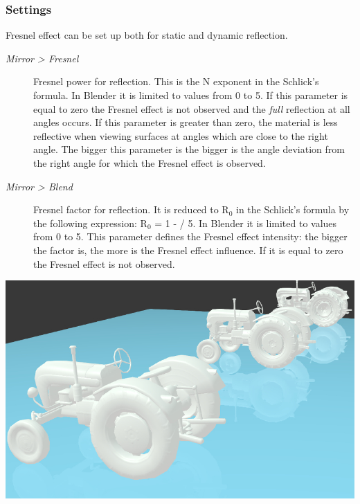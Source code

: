 \documentclass[a4paper,12pt,oneside]{sphinxmanual}
\begin{document}
\subsubsection{Settings}
\label{materials:id12}
Fresnel effect can be set up both for static and dynamic reflection.
\begin{description}
\item[{\emph{Mirror \textgreater{} Fresnel}}] \leavevmode
Fresnel power for reflection. This is the N exponent in the Schlick's formula. In Blender it is limited to values from 0 to 5. If this parameter is equal to zero the Fresnel effect is not observed and the \emph{full} reflection at all angles occurs. If this parameter is greater than zero, the material is less reflective when viewing surfaces at angles which are close to the right angle. The bigger this parameter is the bigger is the angle deviation from the right angle for which the Fresnel effect is observed.

\item[{\emph{Mirror \textgreater{} Blend}}] \leavevmode
Fresnel factor for reflection. It is reduced to R$_{\text{0}}$ in the Schlick's formula by the following expression: R$_{\text{0}}$ = 1 -  / 5. In Blender it is limited to values from 0 to 5. This parameter defines the Fresnel effect intensity: the bigger the  factor is, the more is the Fresnel effect influence. If it is equal to zero the Fresnel effect is not observed.

\end{description}

{\hfill\includegraphics[width=1.000\linewidth]{reflection_dynamic_and_fresnel.jpg}\hfill}

\begin{DUlineblock}{0em}
\item[] 
\end{DUlineblock}
\end{document}
